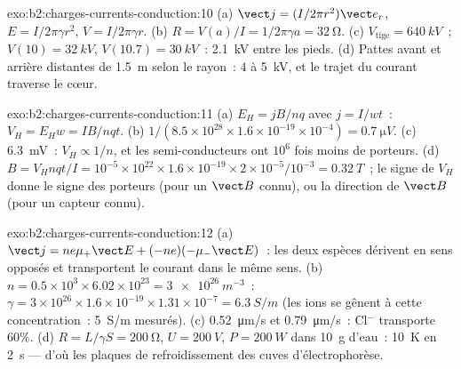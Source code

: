 \begin{solution}{exo:b2:charges-currents-conduction:10}
(a) $\vect j = (I/2\pi r^2)\vect e_r$, $E = I/2\pi\gamma r^2$, $V = I/2\pi\gamma r$. (b) $R = V(a)
/I = 1/2\pi\gamma a = \qty{32}{\ohm}$. (c) $V_{\text{tige}} = \qty{640}{kV}$~; $V(10) = \qty{32}{kV}$,
$V(10.7) = \qty{30}{kV}$~: \qty{2.1}{kV} entre les pieds. (d) Pattes avant et arrière
distantes de \qty{1.5}{m} selon le rayon~: $4$ à \qty{5}{kV}, et le trajet du courant
traverse le cœur.
\end{solution}

\begin{solution}{exo:b2:charges-currents-conduction:11}
(a) $E_H = jB/nq$ avec $j = I/wt$~: $V_H = E_Hw = IB/nqt$. (b) $1/(8.5 \times 10^{28}
\times 1.6 \times 10^{-19} \times 10^{-4}) = \qty{0.7}{\micro V}$. (c) \qty{6.3}{mV}~: $V_H \propto 1/n$,
et les semi-conducteurs ont $10^6$ fois moins de porteurs. (d) $B = V_Hnqt/I =
10^{-5} \times 10^{22} \times 1.6 \times 10^{-19} \times 2 \times 10^{-5}/10^{-3} = \qty{0.32}{T}$~; le signe
de $V_H$ donne le signe des porteurs (pour un $\vect B$ connu), ou la
direction de $\vect B$ (pour un capteur connu).
\end{solution}

\begin{solution}{exo:b2:charges-currents-conduction:12}
(a) $\vect j = ne\mu_+\vect E + (-ne)(-\mu_-\vect E)$~: les deux espèces dérivent en
sens opposés et transportent le courant dans le même sens. (b) $n =
0.5 \times 10^3 \times 6.02 \times 10^{23} = \qty{3e26}{m^{-3}}$~: $\gamma = 3 \times 10^{26} \times 1.6 \times 10^{-19}
\times 1.31 \times 10^{-7} = \qty{6.3}{S/m}$ (les ions se gênent à cette
concentration~: \qty{5}{S/m} mesurés). (c) \qty{0.52}{\micro m/s} et \qty{0.79}{\micro m/s}~:
Cl$^-$ transporte $60\%$. (d) $R = L/\gamma S = \qty{200}{\ohm}$, $U = \qty{200}{V}$, $P =
\qty{200}{W}$ dans \qty{10}{g} d'eau~: \qty{10}{K} en \qty{2}{s} --- d'où les plaques de
refroidissement des cuves d'électrophorèse.
\end{solution}

